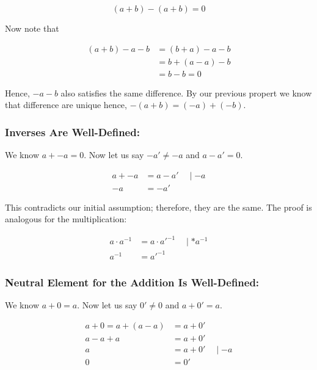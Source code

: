 \[
	(a + b) - (a + b) = 0
\]

Now note that

\begin{align*}
	(a + b) - a - b & =  (b + a) - a - b \\
	                & = b + (a - a) - b  \\
	                & = b - b = 0
\end{align*}

Hence, \(-a - b\) also satisfies the same difference. By our previous propert we know that
difference are unique hence, \(-(a + b) = (-a) + (-b)\).

\QED

\subsubsection{Inverses Are Well-Defined:}

We know \(a + -a = 0\). Now let us say \(-a' \ne -a\) and \(a -a' = 0\).

\begin{align*}
	a + -a & = a - a' \quad \mid - a \\
	-a     & = -a'
\end{align*}

This contradicts our initial assumption; therefore, they are the same. The proof is analogous for the multiplication:

\begin{align*}
	a \cdot a^{-1} & = a \cdot a'^{-1} \quad \mid * a^{-1} \\
	a^{-1}         & = a'^{-1}
\end{align*}

\QED

\subsubsection{Neutral Element for the Addition Is Well-Defined:}

We know \(a + 0 = a\). Now let us say \(0' \ne 0\) and \(a + 0' = a\).

\begin{align*}
	a + 0 = a + (a - a) & =  a + 0'              \\
	a - a + a           & = a + 0'               \\
	a                   & = a + 0' \quad \mid -a \\
	0                   & = 0'
\end{align*}

